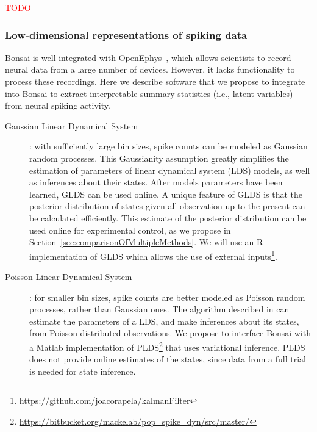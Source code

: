\documentclass[a4paper,11point]{article}
\begin{document}
\noindent\textcolor{red}{TODO}

\subsubsection{Low-dimensional representations of spiking data}
\label{sec:lowDimensionalRepresentationsOfSpikingData}

Bonsai is well integrated with OpenEphys~\citep{siegleEtAl17}, which allows
scientists to record neural data from a large number of devices. However, it
lacks functionality to process these recordings. Here we describe software that
we propose to integrate into Bonsai to extract interpretable summary statistics
(i.e., latent variables) from neural spiking activity.

\begin{description}

    \item[Gaussian Linear Dynamical
        System]\citep[GLDS;][]{andersonAndMoore12}: with sufficiently large
        bin sizes, spike counts can be modeled as Gaussian random processes.
        This Gaussianity assumption greatly simplifies the estimation of
        parameters of linear dynamical system (LDS) models, as well as
        inferences about their states. After models parameters have been
        learned, GLDS can be used online. A unique feature of GLDS is that the
        posterior distribution of states given all observation up to the
        present can be calculated efficiently. This estimate of the posterior
        distribution can be used online for experimental control, as we
        propose in Section~\ref{sec:comparisonOfMultipleMethods}. We will use an R implementation of GLDS
        which allows the use of external
        inputs\footnote{\href{https://github.com/joacorapela/kalmanFilter}{https://github.com/joacorapela/kalmanFilter}}.

    \item[Poisson Linear Dynamical System]\citep[PLDS;][]{mackeEtAl15}: for
        smaller bin sizes, spike counts are better modeled as Poisson random
        processes, rather than Gaussian ones. The algorithm described in
        \citet{mackeEtAl15} can estimate the parameters of a LDS, and make
        inferences about its states, from Poisson distributed observations.  We
        propose to interface Bonsai with a Matlab implementation of
        PLDS\footnote{\href{https://bitbucket.org/mackelab/pop\_spike\_dyn/src/master/}{https://bitbucket.org/mackelab/pop\_spike\_dyn/src/master/}}
        that uses variational inference. PLDS does not provide online estimates
        of the states, since data from a full trial is needed for state
        inference.


\end{description}
\end{document}
